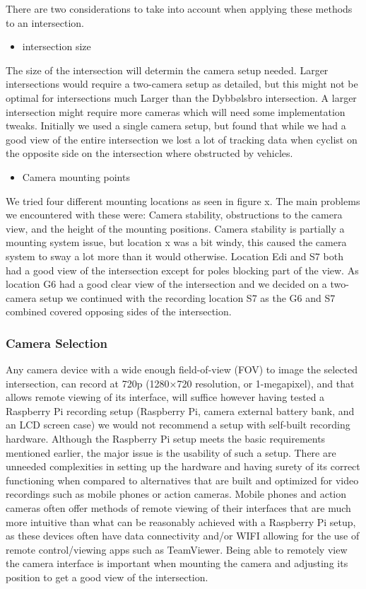 There are two considerations to take into account when applying these methods to an intersection.
\begin{itemize}
\item intersection size
\end{itemize}
The size of the intersection will determin the camera setup needed. Larger intersections would require a two-camera setup as detailed, but this might not be optimal for intersections much Larger
than the Dybbølsbro intersection. A larger intersection might require more cameras which will need some implementation tweaks. Initially we used a single camera setup, but found that
while we had a good view of the entire intersection we lost a lot of tracking data when cyclist on the opposite side on the intersection where obstructed by vehicles.
\begin{itemize}
\item Camera mounting points
\end{itemize}
We tried four different mounting locations as seen in figure x. The main problems we encountered with these were: Camera stability, obstructions to the camera view, and the height of the mounting positions. Camera stability is partially a mounting system issue, but location x was a bit windy, this caused the camera system to sway a lot more than it would otherwise.
Location Edi and S7 both had a good view of the intersection except for poles blocking part of the view. As location G6 had a good clear view of the intersection and we decided on a two-camera setup
we continued with the recording location S7 as the G6 and S7 combined covered opposing sides of the intersection.


\subsubsection{Camera Selection}

Any camera device with a wide enough field-of-view (FOV) to image the selected intersection, can record at 720p (1280×720 resolution, or 1-megapixel), and that allows remote viewing of its interface,
will suffice however having tested a Raspberry Pi recording setup (Raspberry Pi, camera external battery bank, and an LCD screen case) we would not recommend a setup with self-built recording hardware.
Although the Raspberry Pi setup meets the basic requirements mentioned earlier, the major issue is the usability of such a setup. There are unneeded complexities in
setting up the hardware and having surety of its correct functioning when compared to alternatives that are built and optimized for video recordings such as
mobile phones or action cameras. Mobile phones and action cameras often offer methods of remote viewing of their interfaces that are much more
intuitive than what can be reasonably achieved with a Raspberry Pi setup, as these devices often have data connectivity and/or WIFI allowing for the use of remote control/viewing apps such as TeamViewer.
Being able to remotely view the camera interface is important when mounting the camera and adjusting its position to get a good view of the intersection.

